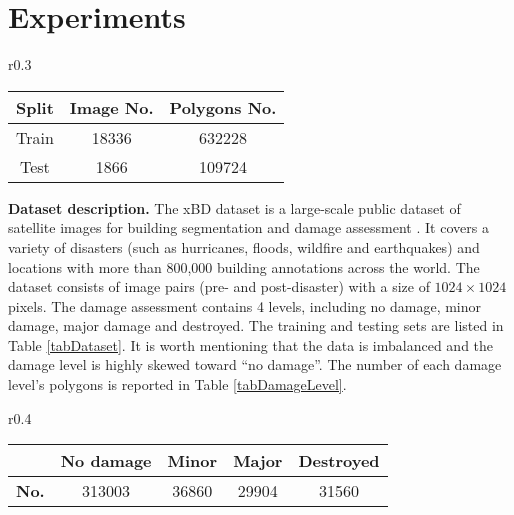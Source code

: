 \documentclass{article}
\begin{document}
\section{Experiments}
\begin{wraptable}{r}{0.3\textwidth}
\vspace{-\intextsep}
\footnotesize
  \caption{xBD dataset splits and annotation numbers.}
  \vspace{-0.3cm}
  \label{tabDataset}
  \begin{center}
  \setlength\tabcolsep{2.0pt} 
  \renewcommand{\arraystretch}{0.8}\begin{tabular}{ccc}
    \toprule
    {Split}     & {Image No.}     & {Polygons No.} \\
    \midrule
    Train & 18336  &  632228     \\
    Test    & 1866  & 109724     \\
    \bottomrule
  \end{tabular}
  \vspace{-0.3cm}
  \end{center}
\end{wraptable}
\textbf{Dataset description.} The xBD dataset is a large-scale public dataset of satellite images for building segmentation and damage assessment \cite{gupta2019xbd}. It covers a variety of disasters (such as hurricanes, floods, wildfire and earthquakes) and locations with more than 800,000 building annotations across the world. The dataset consists of image pairs (pre- and post-disaster) with a size of $1024 \times 1024$ pixels. The damage assessment contains 4 levels, including no damage, minor damage, major damage and destroyed. The training and testing sets are listed in Table \ref{tabDataset}. It is worth mentioning that the data is imbalanced and the damage level is highly skewed toward ``no damage''. The number of each damage level's polygons is reported in Table \ref{tabDamageLevel}.
\begin{wraptable}{r}{0.4\textwidth}
\vspace{-\intextsep}
\footnotesize
  \caption{Damage level annotations.}
  \vspace{-0.3cm}
  \begin{center}
  \setlength\tabcolsep{2.0pt} 
  \renewcommand{\arraystretch}{0.7}\begin{tabular}{ccccc}
    \toprule
    \textbf{}     & No damage    & Minor & Major & Destroyed \\
    \midrule
   \textbf{No.} & 313003  &  36860    & 29904 & 31560 \\
    \bottomrule
  \end{tabular}
  \vspace{-0.3cm}
  \end{center}
    \label{tabDamageLevel}
\end{wraptable}
\end{document}
